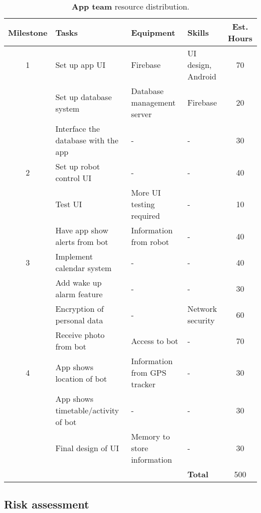 \documentclass{article}
\begin{document}
\begin{table*}[]
  \begin{center}
  \begin{small}
  \begin{tabular}{|c|l|l|l|c|}
    \hline
    {\bf Milestone} & {\bf Tasks} & {\bf Equipment} & {\bf Skills} & {\bf Est. Hours} \\ \hline
    1               & Set up app UI & Firebase & UI design, Android & 70 \\ \cline{2-5}
                    & Set up database system & Database management server & Firebase & 20 \\ \cline{2-5}
                    & Interface the database with the app & - & - & 30 \\ \hline
    2               & Set up robot control UI & - & - & 40 \\ \cline{2-5}
                    & Test UI & More UI testing required & - & 10 \\ \cline{2-5}
                    & Have app show alerts from bot & Information from robot & - & 40 \\ \hline
    3               & Implement calendar system & - & - & 40 \\ \cline{2-5}
                    & Add wake up alarm feature & - & - & 30 \\ \cline{2-5}
                    & Encryption of personal data & - & Network security & 60 \\ \cline{2-5}
                    & Receive photo from bot & Access to bot & - & 70 \\ \hline
    4               & App shows location of bot & Information from GPS tracker & - & 30 \\ \cline{2-5}
                    & App shows timetable/activity of bot & - & - & 30 \\ \cline{2-5}
                    & Final design of UI & Memory to store information & - & 30 \\ \hline
                    &                           &  & {\bf Total} & 500 \\ \hline
  \end{tabular}
  \end{small}
  \caption{{\bf App team} resource distribution.}
  \end{center}
\end{table*}


\subsection{Risk assessment} 
\end{document}
